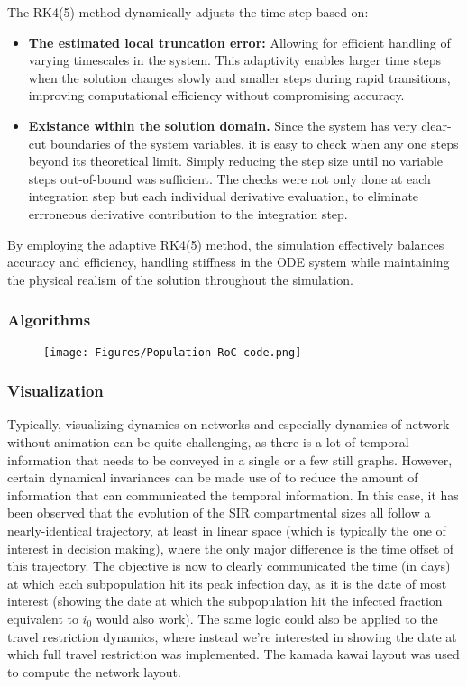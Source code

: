 The RK4(5) method dynamically adjusts the time step based on:
\begin{itemize}
	\item \textbf{The estimated local truncation error:} Allowing for efficient handling of varying timescales in the system. This adaptivity enables larger time steps when the solution changes slowly and smaller steps during rapid transitions, improving computational efficiency without compromising accuracy.
	\item \textbf{Existance within the solution domain.} Since the system has very clear-cut boundaries of the system variables, it is easy to check when any one steps beyond its theoretical limit. Simply reducing the step size until no variable steps out-of-bound was sufficient. The checks were not only done at each integration step but each individual derivative evaluation, to eliminate errroneous derivative contribution to the integration step.
\end{itemize}  

By employing the adaptive RK4(5) method, the simulation effectively balances accuracy and efficiency, handling stiffness in the ODE system while maintaining the physical realism of the solution throughout the simulation.
\subsubsection{Algorithms}
\begin{figure}
	\centering
	\texttt{[image: Figures/Population RoC code.png]}

\end{figure}

\subsubsection{Visualization}
Typically, visualizing dynamics on networks and especially dynamics of network without animation can be quite challenging, as there is a lot of temporal information that needs to be conveyed in a single or a few still graphs. However, certain dynamical invariances can be made use of to reduce the amount of information that can communicated the temporal information. In this case, it has been observed that the evolution of the SIR compartmental sizes all follow a nearly-identical trajectory, at least in linear space (which is typically the one of interest in decision making), where the only major difference is the time offset of this trajectory. The objective is now to clearly communicated the time (in days) at which each subpopulation hit its peak infection day, as it is the date of most interest (showing the date at which the subpopulation hit the infected fraction equivalent to $i_0$ would also work). The same logic could also be applied to the travel restriction dynamics, where instead we're interested in showing the date at which full travel restriction was implemented. The kamada kawai layout was used to compute the network layout. 

